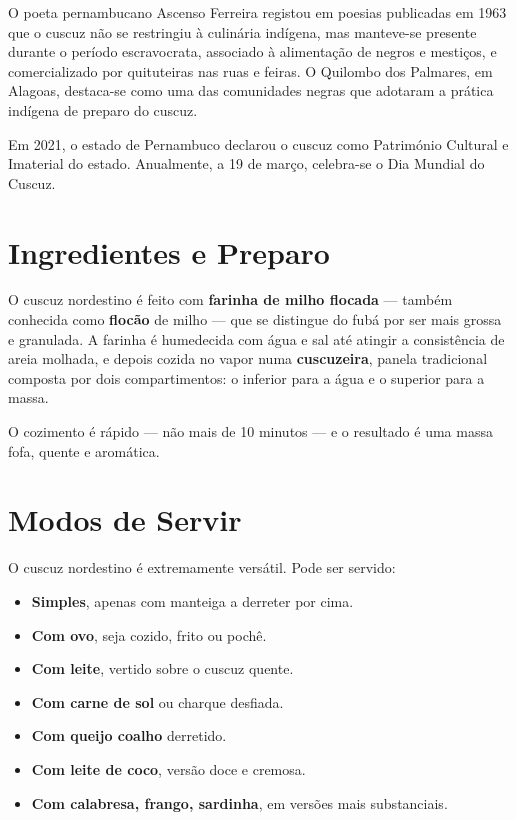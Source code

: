 \documentclass[12pt,a4paper,openright]{book}
\begin{document}
O poeta pernambucano Ascenso Ferreira registou em poesias publicadas em 1963 que o cuscuz não se restringiu à culinária indígena, mas manteve-se presente durante o período escravocrata, associado à alimentação de negros e mestiços, e comercializado por quituteiras nas ruas e feiras. O Quilombo dos Palmares, em Alagoas, destaca-se como uma das comunidades negras que adotaram a prática indígena de preparo do cuscuz.

Em 2021, o estado de Pernambuco declarou o cuscuz como Património Cultural e Imaterial do estado. Anualmente, a 19 de março, celebra-se o Dia Mundial do Cuscuz.

\section{Ingredientes e Preparo}

O cuscuz nordestino é feito com \textbf{farinha de milho flocada} --- também conhecida como \textbf{flocão} de milho --- que se distingue do fubá por ser mais grossa e granulada. A farinha é humedecida com água e sal até atingir a consistência de areia molhada, e depois cozida no vapor numa \textbf{cuscuzeira}, panela tradicional composta por dois compartimentos: o inferior para a água e o superior para a massa.

O cozimento é rápido --- não mais de 10 minutos --- e o resultado é uma massa fofa, quente e aromática.

\section{Modos de Servir}

O cuscuz nordestino é extremamente versátil. Pode ser servido:

\begin{itemize}
    \item \textbf{Simples}, apenas com manteiga a derreter por cima.
    \item \textbf{Com ovo}, seja cozido, frito ou pochê.
    \item \textbf{Com leite}, vertido sobre o cuscuz quente.
    \item \textbf{Com carne de sol} ou charque desfiada.
    \item \textbf{Com queijo coalho} derretido.
    \item \textbf{Com leite de coco}, versão doce e cremosa.
    \item \textbf{Com calabresa, frango, sardinha}, em versões mais substanciais.
\end{itemize}
\end{document}
